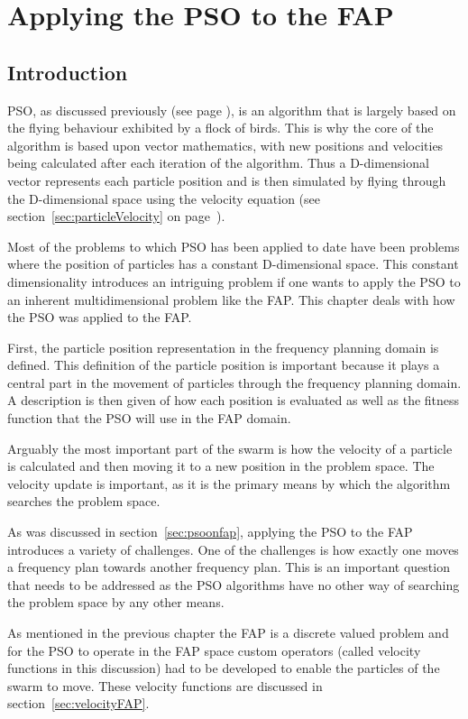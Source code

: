 \chapter{Applying the PSO to the FAP}
\label{chpt:psoapplicationFAP}
\section{Introduction}
PSO, as discussed previously (see page \pageref{sec:PSO}), is an algorithm that is largely based on the flying behaviour exhibited by a flock of birds. This is why the core of the algorithm is based upon vector mathematics, with new positions and velocities being calculated after each iteration of the algorithm. Thus a D-dimensional vector represents each particle position and is then simulated by flying through the D-dimensional space using the velocity equation (see section~\ref{sec:particleVelocity} on page~\pageref{eq:velocityupdate}).

Most of the problems to which \gls{PSO} has been applied to date have been problems where the position of particles has a constant D-dimensional space. This constant dimensionality introduces an intriguing problem if one wants to apply the \gls{PSO} to an inherent multidimensional problem like the \gls{FAP}. This chapter deals with how the \gls{PSO} was applied to the \gls{FAP}.

First, the particle position representation in the frequency planning domain is defined. This definition of the particle position is important because it plays a central part in the movement of particles through the frequency planning domain. A description is then given of how each position is evaluated as well as the fitness function that the \gls{PSO} will use in the \gls{FAP} domain.

Arguably the most important part of the swarm is how the velocity of a particle is calculated and then moving it to a new position in the problem space. The velocity update is important, as it is the primary means by which the algorithm searches the problem space.

As was discussed in section~\ref{sec:psoonfap}, applying the \gls{PSO} to the \gls{FAP} introduces a variety of challenges. One of the challenges is how exactly one moves a frequency plan towards another frequency plan. This is an important question that needs to be addressed as the \gls{PSO} algorithms have no other way of searching the problem space by any other means.

As mentioned in the previous chapter the FAP is a discrete valued problem and for the \gls{PSO} to operate in the \gls{FAP} space custom operators (called velocity functions in this discussion) had to be developed to enable the particles of the swarm to move. These velocity functions are discussed in section~\ref{sec:velocityFAP}. 

